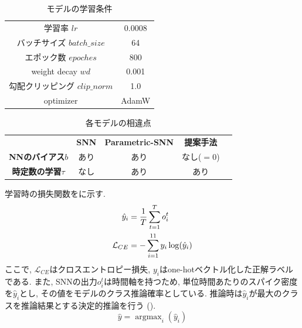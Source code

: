 \begin{table}[htbp]
    \centering
    \caption{モデルの学習条件}
    \label{tab:exp2:train:parameter}
    \begin{tabular}{cc}
        \hline
        学習率 $lr$ & 0.0008\\
        バッチサイズ $batch\_size$ & 64\\
        エポック数 $epoches$ & 800\\
        weight decay $wd$ & 0.001\\
        勾配クリッピング $clip\_norm$ & 1.0\\
        optimizer & AdamW\\
        \hline
    \end{tabular}
\end{table}


\begin{table}[htbp]
    \centering
    \caption{各モデルの相違点}
    \label{tab:exp2:parameter}
    \begin{tabular}{ccccc}
        \hline
         & \textbf{SNN} & \textbf{Parametric-SNN} & \textbf{提案手法}\\
         \textbf{NNのバイアス$b$}&あり&あり&なし($=0$)\\
         \textbf{時定数の学習$\tau$}&なし&あり&あり\\
        \hline
    \end{tabular}
\end{table}

学習時の損失関数をに示す.
\begin{align}
    \hat{y}_i &= \frac{1}{T} \sum_{t=1}^T o_i^t \notag \\
    \mathcal{L}_{CE} &= -\sum_{i=1}^{11} y_i \log(\hat{y}_i) \label{eq:exp2:loss}
\end{align}
ここで, $\mathcal{L}_{CE}$はクロスエントロピー損失, $y_i$はone-hotベクトル化した正解ラベルである.
また, SNNの出力$o_i^t$は時間軸を持つため, 単位時間あたりのスパイク密度を$\hat{y}_i$とし, その値をモデルのクラス推論確率としている.
推論時は$\hat{y}_i$が最大のクラスを推論結果とする決定的推論を行う ().
\begin{equation}
\hat{y} = \mathop{\arg\max}_{i}(\hat{y}_i) \label{eq:exp2:inference}
\end{equation}




